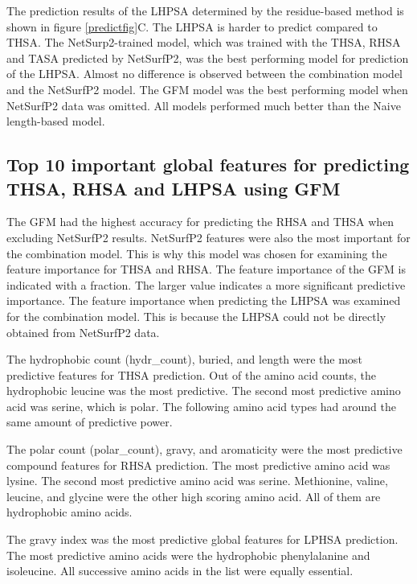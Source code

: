 \documentclass[11pt,a4paper]{article}
\begin{document}
The prediction results of the LHPSA determined by the residue-based method is shown in figure \ref{predictfig}C. The LHPSA is harder to predict compared to THSA. The NetSurp2-trained model,  which was trained with the THSA, RHSA and TASA predicted by NetSurfP2, was the best performing model for prediction of the LHPSA. Almost no difference is observed between the combination model and the NetSurfP2 model. The GFM model was the best performing model when NetSurfP2 data was omitted. All models performed much better than the Naive length-based model.

\subsection{Top 10 important global features for predicting THSA, RHSA and LHPSA using GFM}
The GFM had the highest accuracy for predicting the  RHSA and THSA when excluding NetSurfP2 results. NetSurfP2 features were also the most important for the combination model. This is why this model was chosen for examining the feature importance for THSA and RHSA. The feature importance of the GFM is indicated with a fraction. The larger value indicates a more significant predictive importance. The feature importance when predicting the LHPSA was examined for the combination model. This is because the LHPSA could not be directly obtained from NetSurfP2 data. 

The hydrophobic count (hydr\_count), buried, and length were the most predictive features for THSA prediction. Out of the amino acid counts, the hydrophobic leucine was the most predictive. The second most predictive amino acid was serine, which is polar. The following amino acid types had around the same amount of predictive power. 

The polar count (polar\_count), gravy, and aromaticity were the most predictive compound features for RHSA prediction. The most predictive amino acid was lysine. The second most predictive amino acid was serine. Methionine, valine, leucine, and glycine were the other high scoring amino acid. All of them are hydrophobic amino acids. 

The gravy index was the most predictive global features for LPHSA prediction. The most predictive amino acids were the hydrophobic phenylalanine and isoleucine. All successive amino acids in the list were equally essential.
\end{document}
